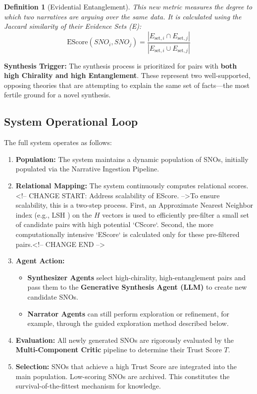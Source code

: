 \documentclass[12pt, a4paper]{article}
\newtheorem{definition}{Definition}[section]
\begin{document}
\begin{definition}[Evidential Entanglement]
This new metric measures the degree to which two narratives are arguing over the same data. It is calculated using the Jaccard similarity of their \textit{Evidence Sets (E)}:
\[
\text{EScore}(SNO_i, SNO_j) = \frac{|E_{\text{set}, i} \cap E_{\text{set}, j}|}{|E_{\text{set}, i} \cup E_{\text{set}, j}|}
\]
\end{definition}

\textbf{Synthesis Trigger:} The synthesis process is prioritized for pairs with \textbf{both high Chirality and high Entanglement}. These represent two well-supported, opposing theories that are attempting to explain the same set of facts—the most fertile ground for a novel synthesis.

\subsection{System Operational Loop}
The full system operates as follows:
\begin{enumerate}
    \item \textbf{Population:} The system maintains a dynamic population of SNOs, initially populated via the Narrative Ingestion Pipeline.
    \item \textbf{Relational Mapping:} The system continuously computes relational scores. <!-- CHANGE START: Address scalability of EScore. -->To ensure scalability, this is a two-step process. First, an Approximate Nearest Neighbor index (e.g., LSH \cite{Indyk1998LSH}) on the $H$ vectors is used to efficiently pre-filter a small set of candidate pairs with high potential `CScore`. Second, the more computationally intensive `EScore` is calculated only for these pre-filtered pairs.<!-- CHANGE END -->
    \item \textbf{Agent Action:}
        \begin{itemize}
            \item \textbf{Synthesizer Agents} select high-chirality, high-entanglement pairs and pass them to the \textbf{Generative Synthesis Agent (LLM)} to create new candidate SNOs.
            \item \textbf{Narrator Agents} can still perform exploration or refinement, for example, through the guided exploration method described below.
        \end{itemize}
    \item \textbf{Evaluation:} All newly generated SNOs are rigorously evaluated by the \textbf{Multi-Component Critic} pipeline to determine their Trust Score $T$.
    \item \textbf{Selection:} SNOs that achieve a high Trust Score are integrated into the main population. Low-scoring SNOs are archived. This constitutes the survival-of-the-fittest mechanism for knowledge.
\end{enumerate}
\end{document}

